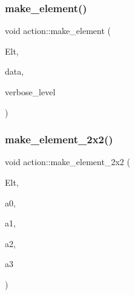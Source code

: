 \mbox{\label{classaction_a920fa2a27583fb60bae10e7b282cdd1d}} 
\subsubsection{\texorpdfstring{make\+\_\+element()}{make\_element()}}
{\footnotesize\ttfamily void action\+::make\+\_\+element (\begin{DoxyParamCaption}\item[{\mbox{\hyperlink{galois_8h_a09fddde158a3a20bd2dcadb609de11dc}{I\+NT}} $\ast$}]{Elt,  }\item[{\mbox{\hyperlink{galois_8h_a09fddde158a3a20bd2dcadb609de11dc}{I\+NT}} $\ast$}]{data,  }\item[{\mbox{\hyperlink{galois_8h_a09fddde158a3a20bd2dcadb609de11dc}{I\+NT}}}]{verbose\+\_\+level }\end{DoxyParamCaption})}

\mbox{\label{classaction_a17fab7163af96b900aae4899bff7332f}} 
\subsubsection{\texorpdfstring{make\+\_\+element\+\_\+2x2()}{make\_element\_2x2()}}
{\footnotesize\ttfamily void action\+::make\+\_\+element\+\_\+2x2 (\begin{DoxyParamCaption}\item[{\mbox{\hyperlink{galois_8h_a09fddde158a3a20bd2dcadb609de11dc}{I\+NT}} $\ast$}]{Elt,  }\item[{\mbox{\hyperlink{galois_8h_a09fddde158a3a20bd2dcadb609de11dc}{I\+NT}}}]{a0,  }\item[{\mbox{\hyperlink{galois_8h_a09fddde158a3a20bd2dcadb609de11dc}{I\+NT}}}]{a1,  }\item[{\mbox{\hyperlink{galois_8h_a09fddde158a3a20bd2dcadb609de11dc}{I\+NT}}}]{a2,  }\item[{\mbox{\hyperlink{galois_8h_a09fddde158a3a20bd2dcadb609de11dc}{I\+NT}}}]{a3 }\end{DoxyParamCaption})}

\mbox{\label{classaction_a6ffd69c8c90b2d1019e441615ba6c3e1}} 
